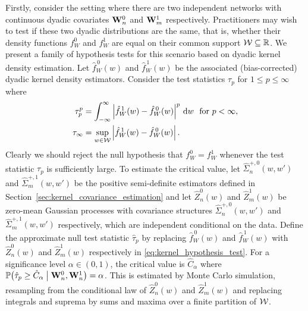 Firstly, consider the setting where there are two independent networks with
continuous dyadic covariates $\mathbf{W}_n^0$ and $\mathbf{W}_m^1$ respectively.
Practitioners may wish to test if these two dyadic distributions are the same,
that is, whether their density functions $f_W^0$ and $f_W^1$ are equal on their
common support $\mathcal{W} \subseteq \mathbb{R}$. We present a family of hypothesis tests for
this scenario based on dyadic kernel density estimation. Let $\hat
f_W^{\,0}(w)$ and $\hat f_W^{\,1}(w)$ be the associated (bias-corrected) dyadic
kernel density estimators. Consider the test statistics $\tau_p$ for
$1 \leq p \leq \infty$ where
%
\begin{align}
  \nonumber
  \tau_p^p
  &= \int_{-\infty}^{\infty}
  \left| \hat f_W^{\,1}(w) - \hat f_W^{\,0}(w) \right|^p
  \,\mathrm{d}w
  \ \text{ for } p < \infty, \\
  \label{eq:kernel_hypothesis_test}
  \tau_\infty
  &= \sup_{w \in \mathcal{W}} \left| \hat f_W^{\,1}(w) - \hat f_W^{\,0}(w) \right|.
\end{align}
%
Clearly we should reject the null hypothesis that $f_W^0 = f_W^1$ whenever the
test statistic $\tau_p$ is sufficiently large. To estimate the critical value,
let $\hat\Sigma_n^{+,0}(w, w')$ and $\hat\Sigma_m^{+,1}(w, w')$ be the positive
semi-definite estimators defined in
Section~\ref{sec:kernel_covariance_estimation} and
let $\hat Z^0_n(w)$ and $\hat Z^1_m(w)$ be zero-mean Gaussian processes with
covariance structures $\hat\Sigma_n^{+,0}(w, w')$ and
$\hat\Sigma_m^{+,1}(w, w')$ respectively, which are independent conditional on
the data. Define the approximate null test statistic $\hat \tau_p$ by replacing
$\hat f_W^{\,0}(w)$ and $\hat f_W^{\,1}(w)$ with $\hat Z^0_n(w)$ and
$\hat Z^1_m(w)$ respectively in \eqref{eq:kernel_hypothesis_test}.
For a significance level
$\alpha \in (0,1)$, the critical value is $\hat C_\alpha$ where
%
$\mathbb{P} \big(
  \hat \tau_p \geq \hat C_\alpha \bigm\vert \mathbf{W}_n^0, \mathbf{W}_n^1
\big) = \alpha$.
%
This is estimated by Monte Carlo simulation, resampling from the conditional
law of $\hat Z^0_n(w)$ and $\hat Z^1_m(w)$ and replacing integrals and suprema
by sums and maxima over a finite partition of $\mathcal{W}$.

